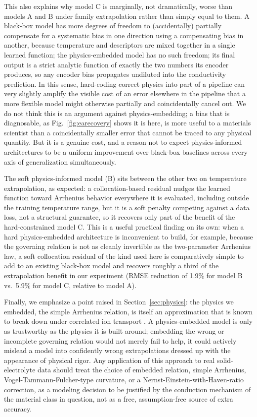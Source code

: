 \documentclass[11pt]{article}
\begin{document}
This also explains why model C is marginally, not dramatically, worse than models A and B under family extrapolation rather than simply equal to them. A black-box model has more degrees of freedom to (accidentally) partially compensate for a systematic bias in one direction using a compensating bias in another, because temperature and descriptors are mixed together in a single learned function; the physics-embedded model has no such freedom; its final output is a strict analytic function of exactly the two numbers its encoder produces, so any encoder bias propagates undiluted into the conductivity prediction. In this sense, hard-coding correct physics into part of a pipeline can very slightly amplify the visible cost of an error elsewhere in the pipeline that a more flexible model might otherwise partially and coincidentally cancel out. We do not think this is an argument against physics-embedding; a bias that is diagnosable, as Fig.~\ref{fig:earecovery} shows it is here, is more useful to a materials scientist than a coincidentally smaller error that cannot be traced to any physical quantity. But it is a genuine cost, and a reason not to expect physics-informed architectures to be a uniform improvement over black-box baselines across every axis of generalization simultaneously.

The soft physics-informed model (B) sits between the other two on temperature extrapolation, as expected: a collocation-based residual nudges the learned function toward Arrhenius behavior everywhere it is evaluated, including outside the training temperature range, but it is a soft penalty competing against a data loss, not a structural guarantee, so it recovers only part of the benefit of the hard-constrained model C. This is a useful practical finding on its own: when a hard physics-embedded architecture is inconvenient to build, for example, because the governing relation is not as cleanly invertible as the two-parameter Arrhenius law, a soft collocation residual of the kind used here is comparatively simple to add to an existing black-box model and recovers roughly a third of the extrapolation benefit in our experiment (RMSE reduction of 1.9\% for model B vs.\ 5.9\% for model C, relative to model A).

Finally, we emphasize a point raised in Section~\ref{sec:physics}: the physics we embedded, the simple Arrhenius relation, is itself an approximation that is known to break down under correlated ion transport \citep{marcolongo2017nernsteinstein}. A physics-embedded model is only as trustworthy as the physics it is built around; embedding the wrong or incomplete governing relation would not merely fail to help, it could actively mislead a model into confidently wrong extrapolations dressed up with the appearance of physical rigor. Any application of this approach to real solid-electrolyte data should treat the choice of embedded relation, simple Arrhenius, Vogel-Tammann-Fulcher-type curvature, or a Nernst-Einstein-with-Haven-ratio correction, as a modeling decision to be justified by the conduction mechanism of the material class in question, not as a free, assumption-free source of extra accuracy.
\end{document}
